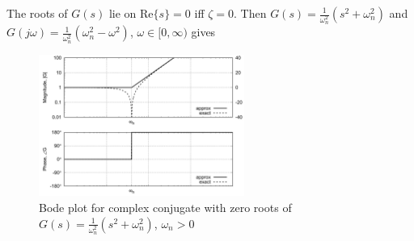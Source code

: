 \documentclass[letterpaper,12pt]{article}
\begin{document}
The roots of $G(s)$ lie on Re$\{s\} = 0$ iff $\zeta = 0$. Then $G(s) = \frac{1}{\omega_{n}^2} (s^2 + \omega_n^2)$ and 
$G(j \omega) = \frac{1}{\omega_{n}^2} (\omega_n^2 - \omega^2)$, $\omega \in [0, \infty)$ gives 
\begin{figure}[h]
    \centering
    \includegraphics[width=0.6\textwidth]{case8 complex conjucate zero.png}
    \caption{Bode plot for complex conjugate with zero roots of $G(s) = \frac{1}{\omega_{n}^2} 
    (s^2 + \omega_n^2)$, $\omega_n > 0$}
\end{figure}
\end{document}
